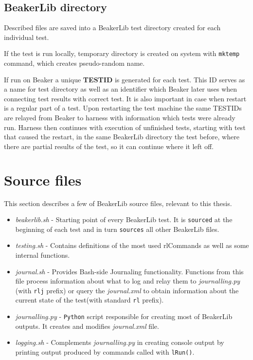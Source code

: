 \subsection{BeakerLib directory}
\label{beakerlib_dir}
Described files are saved into a BeakerLib test directory created for each individual test. 

If the test is run locally, temporary directory is created on system with \texttt{mktemp} command, which creates pseudo-random name.

If run on Beaker a unique \textbf{TESTID} is generated for each test. This ID serves as a name for test directory as well as an identifier which Beaker later uses when connecting test results with correct test. It is also important in case when restart is a regular part of a test. Upon restarting the test machine the same TESTIDs are relayed from Beaker to harness with information which tests were already run. Harness then continues with execution of unfinished tests, starting with test that caused the restart, in the same BeakerLib directory the test before, where there are partial results of the test, so it can continue where it left off.

\section{Source files}
This section describes a few of BeakerLib source files, relevant to this thesis.
\begin{itemize}
\item \textit{beakerlib.sh} - Starting point of every BeakerLib test. It is \texttt{sourced} at the beginning of each test and in turn \texttt{sources} all other BeakerLib files.
\item \textit{testing.sh} - Contains definitions of the most used rlCommands as well as some internal functions.
\item \textit{journal.sh} - Provides Bash-side Journaling functionality. Functions from this file process information about what to log and relay them to \textit{journalling.py} (with \texttt{rlj} prefix) or query the \textit{journal.xml} to obtain information about the current state of the test(with standard \texttt{rl} prefix).
\item \textit{journalling.py} - \texttt{Python} script responsible for creating most of BeakerLib outputs. It creates and modifies \textit{journal.xml} file.
\item \textit{logging.sh} - Complements \textit{journalling.py} in creating console output by printing output produced by commands called with \texttt{lRun()}.
\end{itemize}

